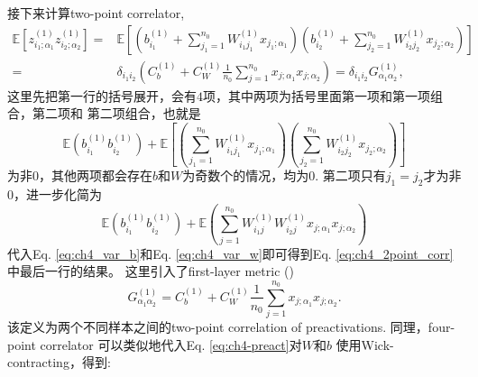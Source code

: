 接下来计算two-point correlator,
\begin{equation}
    \begin{aligned}
        \mathbb{E}\left[z_{i_1;\alpha_1}^{(1)}z_{i_2;\alpha_2}^{(1)}\right]
        =& \mathbb{E}\left[\left(b_{i_1}^{(1)} + 
        \sum_{j_1=1}^{n_0}W_{i_1j_1}^{(1)}x_{j_1;\alpha_1} \right)
        \left(b_{i_2}^{(1)} + \sum_{j_2=1}^{n_0}W_{i_2j_2}^{(1)}x_{j_2;\alpha_2} \right)\right] \\
        =& \delta_{i_1i_2}\left(C_b^{(1)} + C_W^{(1)}\frac{1}{n_0}
            \sum_{j=1}^{n_0} x_{j;\alpha_1}x_{j;\alpha_2}\right) 
        = \delta_{i_1i_2} G_{\alpha_1\alpha_2}^{(1)},
    \end{aligned}
    \label{eq:ch4_2point_corr}
\end{equation}
这里先把第一行的括号展开，会有$4$项，其中两项为括号里面第一项和第一项组合，第二项和
第二项组合，也就是
\begin{equation*}
    \mathbb{E} \left(b_{i_1}^{(1)} b_{i_2}^{(1)} \right) + 
    \mathbb{E} \left[\left(\sum_{j_1=1}^{n_0}W_{i_1j_1}^{(1)}x_{j_1;\alpha_1}\right)
    \left(\sum_{j_2=1}^{n_0}W_{i_2j_2}^{(1)}x_{j_2;\alpha_2} \right)\right]
\end{equation*}
为非$0$，其他两项都会存在$b$和$W$为奇数个的情况，均为$0$. 第二项只有$j_1 = j_2$才为非$0$，进一步化简为
\begin{equation*}
    \mathbb{E} \left(b_{i_1}^{(1)} b_{i_2}^{(1)} \right) + 
    \mathbb{E} \left( \sum_{j=1}^{n_0}W_{i_1j}^{(1)}
        W_{i_2j}^{(1)}x_{j;\alpha_1}x_{j;\alpha_2} \right)
\end{equation*}
代入Eq. \ref{eq:ch4_var_b}和Eq. \ref{eq:ch4_var_w}即可得到Eq. \ref{eq:ch4_2point_corr}中最后一行的结果。
这里引入了first-layer metric ()
\begin{equation}
    G_{\alpha_1\alpha_2}^{(1)} = C_b^{(1)} + C_W^{(1)}\frac{1}{n_0}
            \sum_{j=1}^{n_0} x_{j;\alpha_1}x_{j;\alpha_2}.
    \label{eq:ch4_layer1_metric}
\end{equation}
该定义为两个不同样本之间的two-point correlation of preactivations.
同理，four-point correlator 可以类似地代入Eq. \ref{eq:ch4-preact}对$W$和$b$
使用Wick-contracting，得到:
